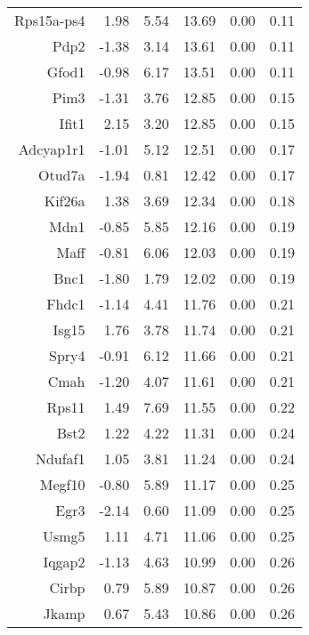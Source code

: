 \begin{table}[ht]
\begin{tabular}{rrrrrr}
  Rps15a-ps4 & 1.98 & 5.54 & 13.69 & 0.00 & 0.11 \\ 
  Pdp2 & -1.38 & 3.14 & 13.61 & 0.00 & 0.11 \\ 
  Gfod1 & -0.98 & 6.17 & 13.51 & 0.00 & 0.11 \\ 
  Pim3 & -1.31 & 3.76 & 12.85 & 0.00 & 0.15 \\ 
  Ifit1 & 2.15 & 3.20 & 12.85 & 0.00 & 0.15 \\ 
  Adcyap1r1 & -1.01 & 5.12 & 12.51 & 0.00 & 0.17 \\ 
  Otud7a & -1.94 & 0.81 & 12.42 & 0.00 & 0.17 \\ 
  Kif26a & 1.38 & 3.69 & 12.34 & 0.00 & 0.18 \\ 
  Mdn1 & -0.85 & 5.85 & 12.16 & 0.00 & 0.19 \\ 
  Maff & -0.81 & 6.06 & 12.03 & 0.00 & 0.19 \\ 
  Bnc1 & -1.80 & 1.79 & 12.02 & 0.00 & 0.19 \\ 
  Fhdc1 & -1.14 & 4.41 & 11.76 & 0.00 & 0.21 \\ 
  Isg15 & 1.76 & 3.78 & 11.74 & 0.00 & 0.21 \\ 
  Spry4 & -0.91 & 6.12 & 11.66 & 0.00 & 0.21 \\ 
  Cmah & -1.20 & 4.07 & 11.61 & 0.00 & 0.21 \\ 
  Rps11 & 1.49 & 7.69 & 11.55 & 0.00 & 0.22 \\ 
  Bst2 & 1.22 & 4.22 & 11.31 & 0.00 & 0.24 \\ 
  Ndufaf1 & 1.05 & 3.81 & 11.24 & 0.00 & 0.24 \\ 
  Megf10 & -0.80 & 5.89 & 11.17 & 0.00 & 0.25 \\ 
  Egr3 & -2.14 & 0.60 & 11.09 & 0.00 & 0.25 \\ 
  Usmg5 & 1.11 & 4.71 & 11.06 & 0.00 & 0.25 \\ 
  Iqgap2 & -1.13 & 4.63 & 10.99 & 0.00 & 0.26 \\ 
  Cirbp & 0.79 & 5.89 & 10.87 & 0.00 & 0.26 \\ 
  Jkamp & 0.67 & 5.43 & 10.86 & 0.00 & 0.26 \\ 
   \hline
\end{tabular}
\end{table}

